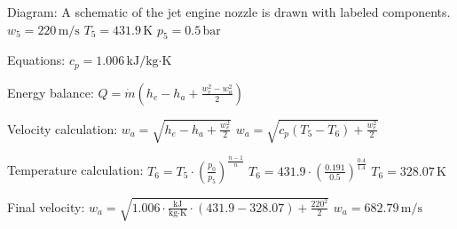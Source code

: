 Diagram:  
A schematic of the jet engine nozzle is drawn with labeled components.  
\( w_5 = 220 \, \text{m/s} \)  
\( T_5 = 431.9 \, \text{K} \)  
\( p_5 = 0.5 \, \text{bar} \)  

Equations:  
\( c_p = 1.006 \, \text{kJ/kg·K} \)  

Energy balance:  
\( Q = \dot{m} (h_e - h_a + \frac{w_e^2 - w_a^2}{2}) \)  

Velocity calculation:  
\( w_a = \sqrt{h_e - h_a + \frac{w_e^2}{2}} \)  
\( w_a = \sqrt{c_p (T_5 - T_6) + \frac{w_e^2}{2}} \)  

Temperature calculation:  
\( T_6 = T_5 \cdot \left( \frac{p_0}{p_5} \right)^{\frac{n-1}{n}} \)  
\( T_6 = 431.9 \cdot \left( \frac{0.191}{0.5} \right)^{\frac{0.4}{1.4}} \)  
\( T_6 = 328.07 \, \text{K} \)  

Final velocity:  
\( w_a = \sqrt{1.006 \cdot \frac{\text{kJ}}{\text{kg·K}} \cdot (431.9 - 328.07) + \frac{220^2}{2}} \)  
\( w_a = 682.79 \, \text{m/s} \)